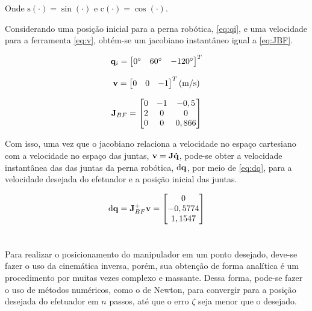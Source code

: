 Onde $\text{s}(\cdot) = \sin(\cdot)$ e $\text{c}(\cdot) = \cos(\cdot)$.

Considerando uma posição inicial para a perna robótica, \eqref{eq:qi}, e uma velocidade para a ferramenta \eqref{eq:v}, obtém-se um jacobiano instantâneo igual a \eqref{eq:JBF}.

\begin{equation}\label{eq:qi}
	\mathbf{q}_i = \begin{bmatrix}
		0^\circ & 60^\circ & -120^\circ
	\end{bmatrix}^T
\end{equation}

\begin{equation}\label{eq:v}
	\mathbf{v} = \begin{bmatrix}
		0 & 0 & -1\end{bmatrix}^T \text{(m/s)}
\end{equation}

\begin{equation}\label{eq:JBF}
	\mathbf{J}_{BF} = \begin{bmatrix}
		0 & -1 & -0,5 \\
		2 & 0 & 0 \\
		0 & 0 & 0,866
	\end{bmatrix}
\end{equation}

Com isso, uma vez que o jacobiano relaciona a velocidade no espaço cartesiano com a velocidade no espaço das juntas, $\mathbf{v} = \mathbf{J}\mathbf{\Dot{q}}$, pode-se obter a velocidade instantânea das das juntas da perna robótica, $\text{d}\mathbf{q}$, por meio de \eqref{eq:dq}, para a velocidade desejada do efetuador e a posição inicial das juntas.

\begin{equation}\label{eq:dq}
	\text{d}\mathbf{q} = \mathbf{J}_{BF}^+ \mathbf{v} = \begin{bmatrix}0 \\ -0,5774 \\ 1,1547 	\end{bmatrix}
\end{equation}





\section{}

Para realizar o posicionamento do manipulador em um ponto desejado, deve-se fazer o uso da cinemática inversa, porém, sua obtenção de forma analítica é um procedimento por muitas vezes complexo e massante. Dessa forma, pode-se fazer o uso de métodos numéricos, como o de Newton, para convergir para a posição desejada do efetuador em $n$ passos, até que o erro $\zeta$ seja menor que o desejado.

